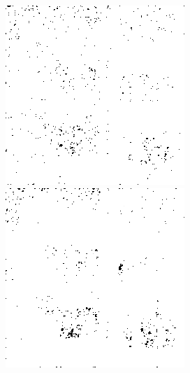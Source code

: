 \begin{figure}[H]
\begin{minipage}[t]{0.245\textwidth}
    \label{fig:noise_30_20}
    \includegraphics[width = \textwidth]{result/noisy/1_30_12.png}
    \label{fig:noise_30_12}
    \includegraphics[width = \textwidth]{result/noisy/1_30_6.png}

\end{minipage}
\end{figure}
